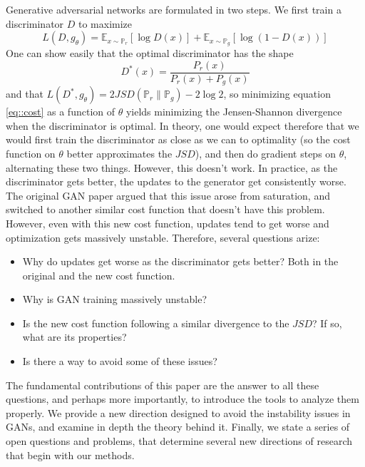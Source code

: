 \documentclass{article} %
\newcommand\EE{\mathbb{E}}
\newcommand\PP{\mathbb{P}}
\theoremstyle{definition}
\begin{document}
Generative adversarial networks are formulated
in two steps. We first train a discriminator $D$ to maximize
\begin{equation} \label{eq::cost}
L(D, g_\theta) = \EE_{x \sim \PP_r}[\log D(x)] + \EE_{x \sim \PP_g}[\log(1 - D(x))]
\end{equation}
One can show easily that the optimal discriminator has the shape
\begin{equation}
D^*(x) = \frac{P_r(x)}{P_r(x) + P_g(x)} \label{eq::optdisc}
\end{equation}
and that $L(D^*, g_\theta) = 2 JSD(\PP_r \| \PP_g) - 2 \log 2$, so minimizing equation \eqref{eq::cost}
as a function of $\theta$ yields minimizing the Jensen-Shannon divergence when the
discriminator is optimal. In theory,
one would expect therefore that we would first train the discriminator as close
as we can to optimality (so the cost function on $\theta$ 
better approximates the $JSD$), and
then do gradient steps on $\theta$, alternating these two things. However, 
this doesn't work. In practice, as the discriminator gets better, the
updates to the generator get consistently worse. The original GAN paper argued that
this issue arose from saturation, and switched
to another similar cost function that doesn't have this problem. However, 
even with this new cost function, updates tend
to get worse and optimization gets massively unstable. Therefore, several
questions arize:
\begin{itemize}
  \item Why do updates get worse as the discriminator gets better? Both
in the original and the new cost function.
  \item Why is GAN training massively unstable?
  \item Is the new cost function following a similar divergence to the $JSD$? If so,
what are its properties?
  \item Is there a way to avoid some of these issues?
\end{itemize}

The fundamental contributions of this paper are the answer to all these questions,
and perhaps more importantly, to introduce the tools to analyze them properly.
We provide a new direction designed to avoid
the instability issues in GANs, and examine in depth the theory behind it.
Finally, we state a series of open questions and problems, that determine several new directions
of research that begin with our methods.
\end{document}
